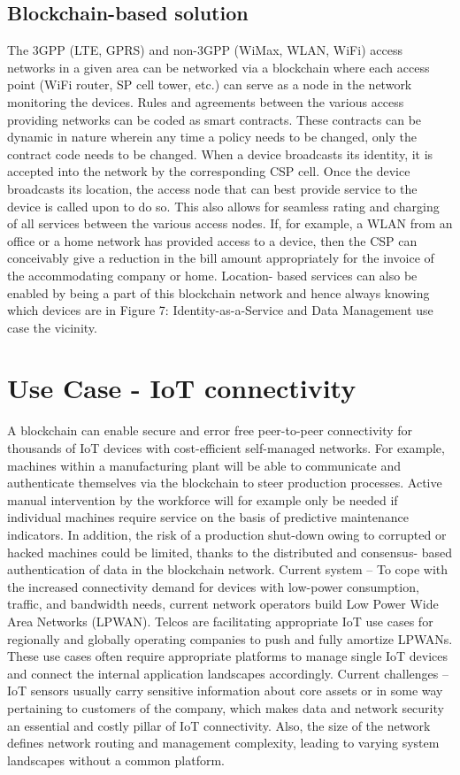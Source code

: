 \documentclass[12pt]{article}
\begin{document}
\subsection{Blockchain-based solution}
The 3GPP (LTE, GPRS) and
non-3GPP (WiMax, WLAN, WiFi)
access networks in a given area can be networked
via a blockchain where each access
point (WiFi router, SP cell tower, etc.) can
serve as a node in the network monitoring
the devices.
Rules and agreements between the various
access providing networks can be coded
as smart contracts. These contracts can be
dynamic in nature wherein any time a policy
needs to be changed, only the contract
code needs to be changed.
When a device broadcasts its identity,
it is accepted into the network by the
corresponding CSP cell. Once the device
broadcasts its location, the access node
that can best provide service to the device
is called upon to do so.
This also allows for seamless rating and
charging of all services between the various
access nodes. If, for example, a WLAN
from an office or a home network has
provided access to a device, then the CSP
can conceivably give a reduction in the bill
amount appropriately for the invoice of the
accommodating company or home. Location-
based services can also be enabled by
being a part of this blockchain network and
hence always knowing which devices are in
Figure 7: Identity-as-a-Service and Data Management use case the vicinity.
\section{Use Case - IoT connectivity}
A blockchain can enable secure and
error free peer-to-peer connectivity for
thousands of IoT devices with cost-efficient
self-managed networks. For example,
machines within a manufacturing plant will
be able to communicate and authenticate
themselves via the blockchain to steer
production processes. Active manual intervention
by the workforce will for example
only be needed if individual machines
require service on the basis of predictive
maintenance indicators. In addition, the
risk of a production shut-down owing to
corrupted or hacked machines could be
limited, thanks to the distributed and consensus-
based authentication of data in the
blockchain network.
Current system – To cope with the increased
connectivity demand for devices
with low-power consumption, traffic, and
bandwidth needs, current network operators
build Low Power Wide Area Networks
(LPWAN). Telcos are facilitating appropriate
IoT use cases for regionally and globally
operating companies to push and fully
amortize LPWANs. These use cases often
require appropriate platforms to manage
single IoT devices and connect the internal
application landscapes accordingly.
Current challenges – IoT sensors usually
carry sensitive information about core assets
or in some way pertaining to customers
of the company, which makes data and
network security an essential and costly
pillar of IoT connectivity. Also, the size of
the network defines network routing and
management complexity, leading to varying
system landscapes without a common
platform.
\end{document}
